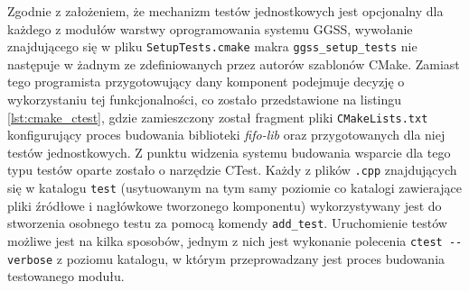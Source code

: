 


Zgodnie z założeniem, że mechanizm testów jednostkowych jest opcjonalny dla każdego z modułów warstwy oprogramowania systemu GGSS, wywołanie znajdującego się w pliku \lstinline{SetupTests.cmake} makra \lstinline{ggss_setup_tests} nie następuje w żadnym ze zdefiniowanych przez autorów szablonów CMake. Zamiast tego programista przygotowujący dany komponent podejmuje decyzję o wykorzystaniu tej funkcjonalności, co zostało przedstawione na listingu \ref{lst:cmake_ctest}, gdzie zamieszczony został fragment pliki \lstinline{CMakeLists.txt} konfigurujący proces budowania biblioteki \emph{fifo-lib} oraz przygotowanych dla niej testów jednostkowych. Z punktu widzenia systemu budowania wsparcie dla tego typu testów oparte zostało o narzędzie CTest. Każdy z plików \lstinline{.cpp} znajdujących się w katalogu \lstinline{test} (usytuowanym na tym samy poziomie co katalogi zawierające pliki źródłowe i nagłówkowe tworzonego komponentu) wykorzystywany jest do stworzenia osobnego testu za pomocą komendy \lstinline{add_test}. Uruchomienie testów możliwe jest na kilka sposobów, jednym z nich jest wykonanie polecenia \lstinline{ctest --verbose} z poziomu katalogu, w którym przeprowadzany jest proces budowania testowanego modułu.

\clearpage



